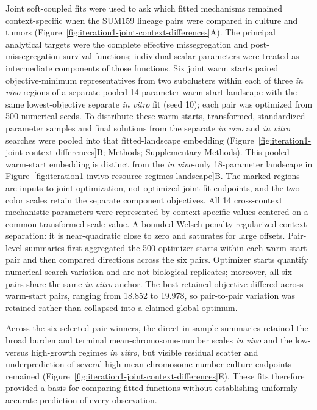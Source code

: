\documentclass[11pt]{article}
\begin{document}
Joint soft-coupled fits were used to ask which fitted mechanisms remained context-specific when the SUM159 lineage pairs were compared in culture and tumors (Figure~\ref{fig:iteration1-joint-context-differences}A). The principal analytical targets were the complete effective missegregation and post-missegregation survival functions; individual scalar parameters were treated as intermediate components of those functions. Six joint warm starts paired objective-minimum representatives from two subclusters within each of three \textit{in vivo} regions of a separate pooled 14-parameter warm-start landscape with the same lowest-objective separate \textit{in vitro} fit (seed 10); each pair was optimized from 500 numerical seeds. To distribute these warm starts, transformed, standardized parameter samples and final solutions from the separate \textit{in vivo} and \textit{in vitro} searches were pooled into that fitted-landscape embedding (Figure~\ref{fig:iteration1-joint-context-differences}B; Methods; Supplementary Methods). This pooled warm-start embedding is distinct from the \textit{in vivo}-only 18-parameter landscape in Figure~\ref{fig:iteration1-invivo-resource-regimes-landscape}B. The marked regions are inputs to joint optimization, not optimized joint-fit endpoints, and the two color scales retain the separate component objectives. All 14 cross-context mechanistic parameters were represented by context-specific values centered on a common transformed-scale value. A bounded Welsch penalty regularized context separation: it is near-quadratic close to zero and saturates for large offsets. Pair-level summaries first aggregated the 500 optimizer starts within each warm-start pair and then compared directions across the six pairs. Optimizer starts quantify numerical search variation and are not biological replicates; moreover, all six pairs share the same \textit{in vitro} anchor. The best retained objective differed across warm-start pairs, ranging from 18.852 to 19.978, so pair-to-pair variation was retained rather than collapsed into a claimed global optimum.

Across the six selected pair winners, the direct in-sample summaries retained the broad burden and terminal mean-chromosome-number scales \textit{in vivo} and the low- versus high-growth regimes \textit{in vitro}, but visible residual scatter and underprediction of several high mean-chromosome-number culture endpoints remained (Figure~\ref{fig:iteration1-joint-context-differences}E). These fits therefore provided a basis for comparing fitted functions without establishing uniformly accurate prediction of every observation.
\end{document}
